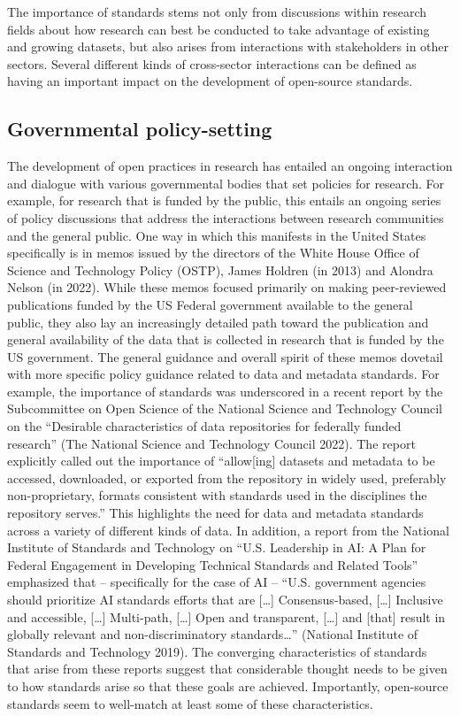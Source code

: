 \documentclass[
  letterpaper,
  DIV=11,
  numbers=noendperiod]{scrartcl}
\begin{document}
The importance of standards stems not only from discussions within
research fields about how research can best be conducted to take
advantage of existing and growing datasets, but also arises from
interactions with stakeholders in other sectors. Several different kinds
of cross-sector interactions can be defined as having an important
impact on the development of open-source standards.

\subsection{Governmental
policy-setting}\label{governmental-policy-setting}

The development of open practices in research has entailed an ongoing
interaction and dialogue with various governmental bodies that set
policies for research. For example, for research that is funded by the
public, this entails an ongoing series of policy discussions that
address the interactions between research communities and the general
public. One way in which this manifests in the United States
specifically is in memos issued by the directors of the White House
Office of Science and Technology Policy (OSTP), James Holdren (in 2013)
and Alondra Nelson (in 2022). While these memos focused primarily on
making peer-reviewed publications funded by the US Federal government
available to the general public, they also lay an increasingly detailed
path toward the publication and general availability of the data that is
collected in research that is funded by the US government. The general
guidance and overall spirit of these memos dovetail with more specific
policy guidance related to data and metadata standards. For example, the
importance of standards was underscored in a recent report by the
Subcommittee on Open Science of the National Science and Technology
Council on the ``Desirable characteristics of data repositories for
federally funded research'' (The National Science and Technology Council
2022). The report explicitly called out the importance of
``allow{[}ing{]} datasets and metadata to be accessed, downloaded, or
exported from the repository in widely used, preferably non-proprietary,
formats consistent with standards used in the disciplines the repository
serves.'' This highlights the need for data and metadata standards
across a variety of different kinds of data. In addition, a report from
the National Institute of Standards and Technology on ``U.S. Leadership
in AI: A Plan for Federal Engagement in Developing Technical Standards
and Related Tools'' emphasized that -- specifically for the case of AI
-- ``U.S. government agencies should prioritize AI standards efforts
that are {[}\ldots{]} Consensus-based, {[}\ldots{]} Inclusive and
accessible, {[}\ldots{]} Multi-path, {[}\ldots{]} Open and transparent,
{[}\ldots{]} and {[}that{]} result in globally relevant and
non-discriminatory standards\ldots{}'' (National Institute of Standards
and Technology 2019). The converging characteristics of standards that
arise from these reports suggest that considerable thought needs to be
given to how standards arise so that these goals are achieved.
Importantly, open-source standards seem to well-match at least some of
these characteristics.
\end{document}
